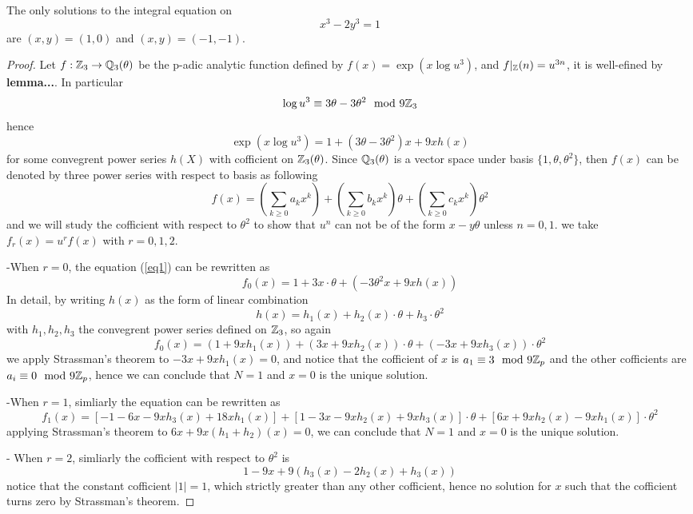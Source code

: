     \begin{theorem}
        The only solutions to the integral equation on
\[
x^{3}-2y^{3}=1
\]
are\/ $(x,y)=(1,0)$ and\/ $(x,y)=(-1,-1)$.

    \begin{proof}
         Let \(f: \mathbb{Z}_3 \to \mathbb{Q}_3(\theta)\) be the p-adic analytic function defined by \(f(x) = \exp({x\log{u^3}})\), and \(f|_{\mathbb{Z}}(n) = u^{3n}\), it is well-efined by \textbf{lemma...}. In particular
         \[\log{u^3} \equiv  3\theta-3\theta^2 \mod{9 \mathbb{Z}_3}\]
         hence 
         \begin{equation} \label{eq1}
            \exp(x \log u^3) = 1 + (3\theta-3\theta^2)x+9xh(x)
         \end{equation}
         for some convegrent power series \(h(X)\) with cofficient on \(\mathbb{Z}_3(\theta)\). Since \(\mathbb{Q}_3(\theta)\) is a vector space under basis \(\{1, \theta, \theta^2\}\), then \(f(x)\) can be denoted by three power series with respect to basis as following
         \[f(x) = (\sum_{k \geq 0}a_kx^k)+(\sum_{k \geq 0}b_kx^k)\theta + (\sum_{k \geq 0}c_kx^k)\theta^2\]
         and we will study the cofficient with respect to \(\theta^2\) to show that \(u^n\) can not be of the form \(x-y \theta\) unless \(n=0,1\). we take \(f_r(x) = u^{r}f(x)\) with \(r=0,1,2\).

         -When \(r=0\), the equation (\ref{eq1}) can be rewritten as
         \[f_0(x) = 1+ 3x\cdot \theta + (-3\theta^2x+9xh(x))\]
         In detail, by writing \(h(x)\) as the form of linear combination
         \[h(x) = h_1(x)+h_2(x)\cdot\theta + h_3 \cdot \theta^2\]
         with \(h_1,h_2,h_3\) the convegrent power series defined on \(\mathbb{Z}_3\), so again
         \[f_0(x) = (1+9xh_1(x)) + (3x+9xh_2(x))\cdot \theta + (-3x+9xh_3(x)) \cdot \theta^2\]
         we apply Strassman's theorem to \(-3x+9xh_1(x) = 0\), and notice that the cofficient of \(x\) is \(a_1 \equiv 3 \mod 9\mathbb{Z}_p\) and the other cofficients are \(a_i \equiv 0 \mod 9\mathbb{Z}_p \), hence we can conclude that \(N=1\) and \(x=0\) is the unique solution.
         
         -When \(r=1\), simliarly the equation can be rewritten as
         \[f_1(x) = [-1-6x-9xh_3(x)+18xh_1(x)]+[1-3x-9xh_2(x)+9xh_3(x)]\cdot \theta + [6x+9xh_2(x)-9xh_1(x)]\cdot \theta^2\]
         applying Strassman's theorem to \(6x+9x(h_1+h_2)(x) = 0\), we can conclude that \(N=1\) and \(x=0\) is the unique solution.

         - When \(r=2\), simliarly the cofficient with respect to \(\theta^2\) is \[1-9x+9(h_3(x)-2h_2(x)+h_3(x)) \]
         notice that the constant cofficient \(|1| = 1\), which strictly greater than any other cofficient, hence no solution for \(x\) such that the cofficient turns zero by Strassman's theorem.


\end{proof}
\end{theorem}

